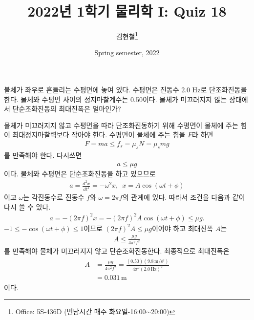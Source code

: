 \documentclass[floatfix,nofootinbib,superscriptaddress,fleqn]{revtex4-2}
\begin{document}
\title{\Large 2022년 1학기 물리학 I: Quiz 18}
\author{김현철\footnote{Office: 5S-436D (면담시간 매주
    화요일-16:00$\sim$20:00)}} 
\date{Spring semester, 2022}


\vspace{1.cm}

\maketitle

 
불체가 좌우로 흔들리는 수평면에 놓여 있다. 수평면은 진동수 2.0 Hz로
단조화진동을 한다. 물체와 수평면 사이의 정지마찰계수는
0.50이다. 물체가 미끄러지지 않는 상태에서 단순조화진동의 최대진폭은
얼마인가? 
  
물체가 미끄러지지 않고 수평면을 따라 단조화진동하기 위해 수평면이 물체에 주는 힘이
최대정지마찰력보다 작아야 한다. 수평면이 물체에 주는 힘을 $F$라 하면
\begin{align}
  F = ma  \leq f_s = \mu_s N = \mu_s mg
\end{align}
를 만족해야 한다. 다시쓰면
\begin{align}
  a  \leq \mu g
\end{align}
이다. 물체와 수평면은 단순조화진동을 하고 있으므로
 \begin{align}
   a = \frac{d^2x}{dt^2} = -\omega^2x,\,\,\,
   x = A\cos(\omega t+\phi)
 \end{align}
 이고 $\omega$는 각진동수로 진동수 $f$와 $\omega = 2\pi f$의 관계에 있다.
 따라서 조건을 다음과 같이 다시 쓸 수 있다.
 \begin{align}
   a = -(2\pi f)^2x = -(2\pi f)^2A\cos(\omega t+\phi)  \leq \mu g.
 \end{align}
 $-1\leq-\cos(\omega t+\phi)\leq 1$이므로 $(2\pi f)^2A \leq\mu g$이어야 하고
 최대진폭 $A$는
 \begin{align}
   A \leq \frac{\mu g}{4\pi^2f^2}
 \end{align}
 를 만족해야 물체가 미끄러지지 않고 단순조화진동한다. 최종적으로 최대진폭은
 \begin{align}
  \begin{split}
    A &= \frac{\mu g}{4\pi^2f^2} 
    = \frac{(0.50)(9.8\,\mathrm{m/s^2})}{4\pi^2(2.0\,\mathrm{Hz})^2}  \\
    &=0.031\,\mathrm{m}
  \end{split}
 \end{align}
 이다.
\newpage
 
\end{document}
